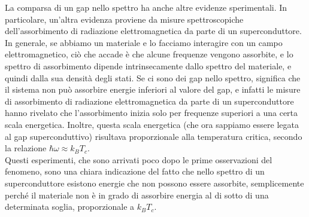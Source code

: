 \hspace{-0.6cm}La comparsa di un gap nello spettro ha anche altre evidenze sperimentali. In particolare, un'altra evidenza proviene da misure spettroscopiche dell'assorbimento di radiazione elettromagnetica da parte di un superconduttore. In generale, se abbiamo un materiale e lo facciamo interagire con un campo elettromagnetico, ciò che accade è che alcune frequenze vengono assorbite, e lo spettro di assorbimento dipende intrinsecamente dallo spettro del materiale, e quindi dalla sua densità degli stati. Se ci sono dei gap nello spettro, significa che il sistema non può assorbire energie inferiori al valore del gap, e infatti le misure di assorbimento di radiazione elettromagnetica da parte di un superconduttore hanno rivelato che l'assorbimento inizia solo per frequenze superiori a una certa scala energetica. Inoltre, questa scala energetica (che ora sappiamo essere legata al gap superconduttivo) risultava proporzionale alla temperatura critica, secondo la relazione $\hbar \omega \approx k_B T_c$.\\
Questi esperimenti, che sono arrivati poco dopo le prime osservazioni del fenomeno, sono una chiara indicazione del fatto che nello spettro di un superconduttore esistono energie che non possono essere assorbite, semplicemente perché il materiale non è in grado di assorbire energia al di sotto di una determinata soglia, proporzionale a $k_B T_c$.\\
